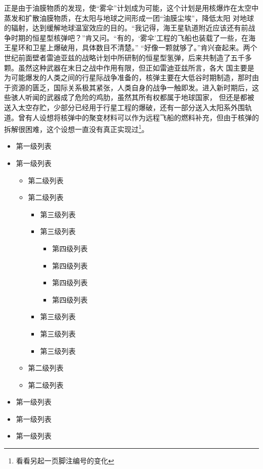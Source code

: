 正是由于油膜物质的发现，使“雾伞”计划成为可能，这个计划是用核爆炸在太空中蒸发和扩散油膜物质，在太阳与地球之间形成一团“油膜尘埃”，降低太阳 对地球的辐射，达到缓解地球温室效应的目的。“我记得，海王星轨道附近应该还有前战争时期的恒星型核弹吧？”肯又问。“有的，‘雾伞’工程的飞船也装载了一些，在海王星环和卫星上爆破用，具体数目不清楚。” “好像一颗就够了。”肯兴奋起来。两个世纪前面壁者雷迪亚兹的战略计划中所研制的恒星型氢弹，后来共制造了五千多颗。虽然这种武器在末日之战中作用有限，但正如雷迪亚兹所言，各大 国主要是为可能爆发的人类之间的行星际战争准备的，核弹主要在大低谷时期制造，那时由于资源的匮乏，国际关系极其紧张，人类自身的战争一触即发。进入新时期后，这些骇人听闻的武器成了危险的鸡肋，虽然其所有权都属于地球国家， 但还是都被送入太空存贮，少部分已经用于行星工程的爆破，还有一部分送入太阳系外围轨道。曾有人设想将核弹中的聚变材料可以作为远程飞船的燃料补充，但由于核弹的拆解很困难，这个设想一直没有真正实现过\footnote{看看另起一页脚注编号的变化}。
\begin{itemize}
	\item 第一级列表
	\item 第一级列表
	\begin{itemize}
		\item 第二级列表
		\item 第二级列表
		\begin{itemize}
			\item 第三级列表
			\item 第三级列表
			\begin{itemize}
				\item 第四级列表
				\item 第四级列表
				\item 第四级列表
				\item 第四级列表
			\end{itemize}
			\item 第三级列表
			\item 第三级列表
			\item 第三级列表
		\end{itemize}
		\item 第二级列表
		\item 第二级列表
	\end{itemize}
	\item 第一级列表
	\item 第一级列表
	\item 第一级列表
\end{itemize}


